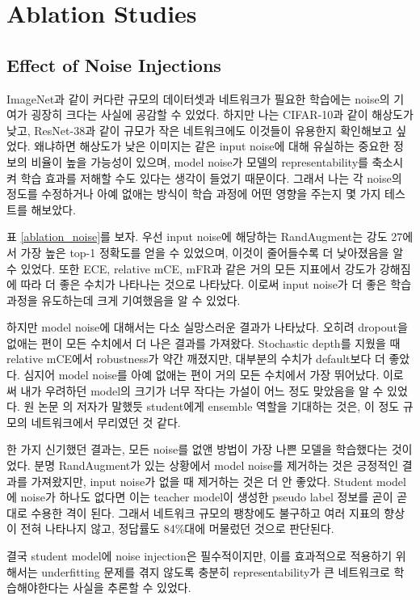\documentclass[a4paper, 10pt]{article}
\begin{document}
\section{Ablation Studies}
\subsection{Effect of Noise Injections}
ImageNet과 같이 커다란 규모의 데이터셋과 네트워크가 필요한 학습에는 noise의
기여가 굉장히 크다는 사실에 공감할 수 있었다. \cite{xie2020selftraining} 하지만
나는 CIFAR-10과 같이 해상도가 낮고, ResNet-38과 같이 규모가 작은 네트워크에도
이것들이 유용한지 확인해보고 싶었다. 왜냐하면 해상도가 낮은 이미지는 같은
input noise에 대해 유실하는 중요한 정보의 비율이 높을 가능성이 있으며, model
noise가 모델의 representability를 축소시켜 학습 효과를 저해할 수도 있다는 생각이
들었기 때문이다. 그래서 나는 각 noise의 정도를 수정하거나 아예 없애는 방식이
학습 과정에 어떤 영향을 주는지 몇 가지 테스트를 해보았다.

표 \ref{ablation_noise}를 보자. 우선 input noise에 해당하는 RandAugment는 강도
27에서 가장 높은 top-1 정확도를 얻을 수 있었으며, 이것이 줄어들수록 더
낮아졌음을 알 수 있었다. 또한 ECE, relative mCE, mFR과 같은 거의 모든 지표에서
강도가 강해짐에 따라 더 좋은 수치가 나타나는 것으로 나타났다. 이로써 input
noise가 더 좋은 학습 과정을 유도하는데 크게 기여했음을 알 수 있었다.

하지만 model noise에 대해서는 다소 실망스러운 결과가 나타났다. 오히려 dropout을
없애는 편이 모든 수치에서 더 나은 결과를 가져왔다. Stochastic depth를 지웠을
때 relative mCE에서 robustness가 약간 깨졌지만, 대부분의 수치가 default보다 더
좋았다. 심지어 model noise를 아예 없애는 편이 거의 모든 수치에서 가장 뛰어났다.
이로써 내가 우려하던 model의 크기가 너무 작다는 가설이 어느 정도 맞았음을 알 수
있었다. 원 논문 \cite{xie2020selftraining}의 저자가 말했듯 student에게 ensemble
역할을 기대하는 것은, 이 정도 규모의 네트워크에서 무리였던 것 같다.

한 가지 신기했던 결과는, 모든 noise를 없앤 방법이 가장 나쁜 모델을 학습했다는
것이었다. 분명 RandAugment가 있는 상황에서 model noise를 제거하는 것은 긍정적인
결과를 가져왔지만, input noise가 없을 때 제거하는 것은 더 안 좋았다. Student
model에 noise가 하나도 없다면 이는 teacher model이 생성한 pseudo label 정보를
곧이 곧대로 수용한 격이 된다. 그래서 네트워크 규모의 팽창에도 불구하고 여러
지표의 향상이 전혀 나타나지 않고, 정답률도 84\%대에 머물렀던 것으로 판단된다.

결국 student model에 noise injection은 필수적이지만, 이를 효과적으로 적용하기
위해서는 underfitting 문제를 겪지 않도록 충분히 representability가 큰 네트워크로
학습해야한다는 사실을 추론할 수 있었다.
\end{document}
